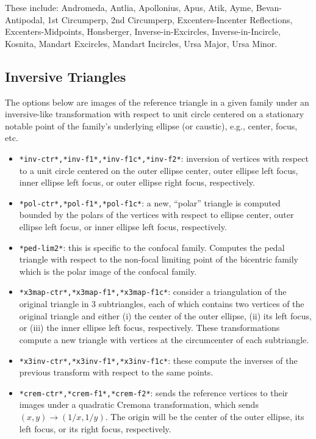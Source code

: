 These include: Andromeda, Antlia, Apollonius, Apus, Atik, Ayme, Bevan-Antipodal, 1st Circumperp, 2nd Circumperp, Excenters-Incenter Reflections, Excenters-Midpoints, Honsberger, Inverse-in-Excircles, Inverse-in-Incircle, Kosnita, Mandart Excircles, Mandart Incircles, Ursa Major, Ursa Minor. 

\subsection{Inversive Triangles}
\label{sec:09-adv-tri-families}

The options below are images of the reference triangle in a given family under an inversive-like transformation with respect to  unit circle centered on a stationary notable point of the family's underlying ellipse (or caustic), e.g., center, focus, etc.

\begin{itemize}
\item \texttt{*inv-ctr*,*inv-f1*,*inv-f1c*,*inv-f2*}: inversion of vertices with respect to a unit circle centered on the outer ellipse center, outer ellipse left focus, inner ellipse left focus, or outer ellipse right focus, respectively.
\item \texttt{*pol-ctr*,*pol-f1*,*pol-f1c*}: a new, ``polar'' triangle is computed bounded by the polars of the vertices with respect to ellipse center, outer ellipse left focus, or inner ellipse left focus, respectively.
\item \texttt{*ped-lim2*}: this is specific to the confocal family. Computes the pedal triangle with respect to the non-focal limiting point of the bicentric family which is the polar image of the confocal family. 
\item \texttt{*x3map-ctr*,*x3map-f1*,*x3map-f1c*}: consider a triangulation of the original triangle in 3 subtriangles, each of which contains two vertices of the original triangle and either (i) the center of the outer ellipse, (ii) its left focus, or (iii) the inner ellipse left focus, respectively. These transformations compute a new triangle with vertices at the circumcenter of each subtriangle.
\item \texttt{*x3inv-ctr*,*x3inv-f1*,*x3inv-f1c*}: these compute the inverses of the previous transform with respect to the same points.
\item \texttt{*crem-ctr*,*crem-f1*,*crem-f2*}: sends the reference vertices to their images under a quadratic Cremona transformation, which sends $(x,y)\rightarrow(1/x,1/y)$. The origin will be the center of the outer ellipse, its left focus, or its right focus, respectively. 
\end{itemize}

